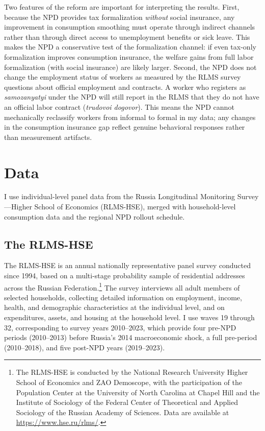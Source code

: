 \documentclass[12pt]{article}
\begin{document}
Two features of the reform are important for interpreting the results. First, because the NPD provides tax formalization \textit{without} social insurance, any improvement in consumption smoothing must operate through indirect channels rather than through direct access to unemployment benefits or sick leave. This makes the NPD a conservative test of the formalization channel: if even tax-only formalization improves consumption insurance, the welfare gains from full labor formalization (with social insurance) are likely larger. Second, the NPD does not change the employment status of workers as measured by the RLMS survey questions about official employment and contracts. A worker who registers as \textit{samozanyatyi} under the NPD will still report in the RLMS that they do not have an official labor contract (\textit{trudovoi dogovor}). This means the NPD cannot mechanically reclassify workers from informal to formal in my data; any changes in the consumption insurance gap reflect genuine behavioral responses rather than measurement artifacts.


\section{Data}
\label{sec:data}

I use individual-level panel data from the Russia Longitudinal Monitoring Survey---Higher School of Economics (RLMS-HSE), merged with household-level consumption data and the regional NPD rollout schedule.

\subsection{The RLMS-HSE}

The RLMS-HSE is an annual nationally representative panel survey conducted since 1994, based on a multi-stage probability sample of residential addresses across the Russian Federation.\footnote{The RLMS-HSE is conducted by the National Research University Higher School of Economics and ZAO Demoscope, with the participation of the Population Center at the University of North Carolina at Chapel Hill and the Institute of Sociology of the Federal Center of Theoretical and Applied Sociology of the Russian Academy of Sciences. Data are available at \url{https://www.hse.ru/rlms/}.} The survey interviews all adult members of selected households, collecting detailed information on employment, income, health, and demographic characteristics at the individual level, and on expenditures, assets, and housing at the household level. I use waves 19 through 32, corresponding to survey years 2010--2023, which provide four pre-NPD periods (2010--2013) before Russia's 2014 macroeconomic shock, a full pre-period (2010--2018), and five post-NPD years (2019--2023).
\end{document}
